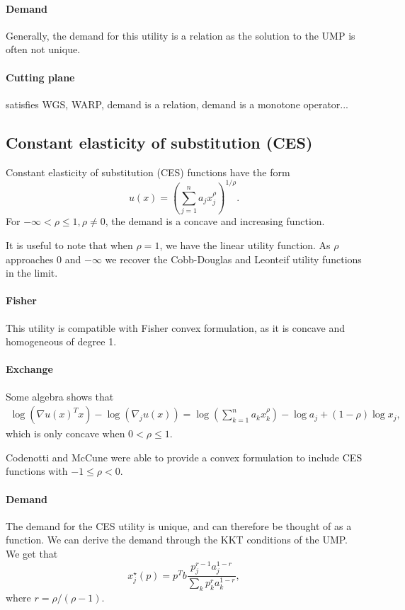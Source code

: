 \documentclass[12pt]{article}
\begin{document}
\paragraph{Demand}
Generally, the demand for this utility is a relation as the solution
to the UMP is often not unique.

\paragraph{Cutting plane}
satisfies WGS, WARP, demand is a relation, demand is a monotone operator...

\subsection{Constant elasticity of substitution (CES)}
Constant elasticity of substitution (CES) functions have the form
\[
u(x) = \left(\sum_{j=1}^n a_j x_j^\rho \right)^{1/\rho}.
\]
For $-\infty < \rho \leq 1, \rho \neq 0$, the demand is a concave and
increasing function.

It is useful to note that when $\rho = 1$, we have the linear utility function. As $\rho$ approaches $0$ and $-\infty$ we recover the Cobb-Douglas and Leonteif
utility functions in the limit. %

\paragraph{Fisher}
This utility is compatible with Fisher convex formulation, as it is concave and homogeneous of degree 1.

\paragraph{Exchange}
Some algebra shows that 
\begin{align*}
\log(\nabla u(x)^T x) - \log(\nabla_j u(x)) =
\log\left(\sum_{k=1}^n a_k x_k^\rho \right) - \log a_j + (1-\rho) \log x_j,
\end{align*}
which is only concave when $0 < \rho \leq 1$.

Codenotti and McCune \cite{codenotti2005marketCES} were able to provide a convex formulation to include
CES functions with $-1 \leq \rho < 0$.

\paragraph{Demand}
The demand for the CES utility is unique, and can therefore be thought
of as a function.
We can derive the demand through the KKT conditions of the
UMP. We get that
\[
x^\star_j(p) = p^Tb\frac{p_j^{r-1} a_j^{1-r}}{\sum_k p_k^r a_k^{1-r}},
\]
where $r = \rho/(\rho-1)$.
\end{document}
